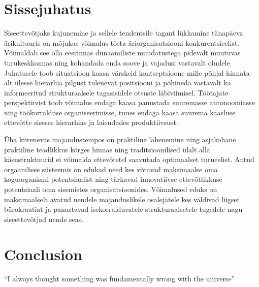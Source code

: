 \documentclass{EUASThesis}
\begin{document}

\titleformat{\section}[block]{\normalfont\large\bfseries}{\thesection}{0.333em}{}

\vspace{\baselineskip}
\tableofcontents
\vspace{\baselineskip}

\section{Sissejuhatus}
Siseettevõtjaks kujunemine ja sellele tendentsile tagant lükkamine tänapäeva ärikultuuris on mõjukas võimalus tõsta äriorganisatsiooni konkurentsieelist. Võimaldab see olla eesrinnas dünaamiliste muudatustega pidevalt muutuvas turukeskkonnas ning kohandada enda soove ja vajadusi vastavalt oludele. Juhatusele toob situatsioon kaasa värskeid kontseptsioone mille põhjal hinnata alt ülesse hierarhia pilgust tulenevat positsiooni ja põhineda vastavalt ka informeeritud strukturaalsele tagasisidele otsuste läbiviimisel. Töötajate perspektiivist toob võimalus endaga kaasa panustada suuremasse autonoomiasse ning töökorralduse organiseerimisse, tuues endaga kaasa suurema kaasluse ettevõtte siseses hierarhias ja laiendades produktiivsust.\par

Üha kiirenevas majandustempos on praktiline lähenemine ning asjakohane praktiline teadlikkus kõrges hinnas ning traditsioonilised ülalt alla käsustruktuurid ei võimalda ettevõtetel saavutada optimaalset turueelist. Antud orgaanilises süsteemis on edukad need kes võtavad maksimaalse oma koguorganismi potentsiaalist ning tärkavad innovatiivse ettevõtlikkuse potentsiaali oma sisemistes organisatsioonides. Võimalused eduks on maksimaalselt avatud nendele majanduslikele osalejatele kes väldivad liigset bürokraatiat ja panustavad isekorralduvatele strukturaalsetele tugedele nagu siseettevõtjad nende seas. \par


\section{Conclusion}
``I always thought something was fundamentally wrong with the universe''
\end{document}
